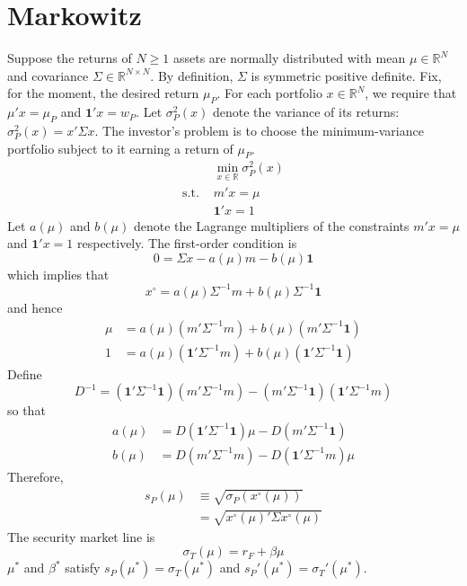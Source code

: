 \documentclass[12pt]{article}
\begin{document}
	\onehalfspacing
\section{Markowitz}
	Suppose the returns of $N\geq1$ assets are normally distributed with mean $\mu\in\mathbb{R}^{N}$ and covariance $\Sigma\in\mathbb{R}^{N\times N}$. By definition, $\Sigma$ is symmetric positive definite. Fix, for the moment, the desired return $\mu_{P}$. For each portfolio $x\in\mathbb{R}^{N}$, we require that $\mu'x=\mu_{P}$ and $\mathbf{1}'x=w_{P}$. Let $\sigma_{P}^{2}(x)$ denote the variance of its returns: $\sigma_{P}^{2}(x)=x'\Sigma x$. The investor's problem is to choose the minimum-variance portfolio subject to it earning a return of $\mu_{P}$. 
\begin{equation}
	\begin{array}{rl}
		&\min_{x\in\mathbb{R}}\sigma_{P}^{2}(x)\\
		\text{s.t. }&m'x=\mu\\
		&\mathbf{1}'x=1
	\end{array}
\end{equation}
Let $a(\mu)$ and $b(\mu)$ denote the Lagrange multipliers of the constraints $m'x=\mu$ and $\mathbf{1}'x=1$ respectively. The first-order condition is
\begin{equation}
	0=\Sigma x-a(\mu)m-b(\mu)\mathbf{1}
\end{equation}
which implies that
\begin{equation}
	x^{\circ}=a(\mu)\Sigma^{-1}m+b(\mu)\Sigma^{-1}\mathbf{1}
\end{equation}
and hence
\begin{align}
	\mu&=a(\mu)\left(m'\Sigma^{-1}m\right)+b(\mu)\left(m'\Sigma^{-1}\mathbf{1}\right)\\
	1&=a(\mu)\left(\mathbf{1}'\Sigma^{-1}m\right)+b(\mu)\left(\mathbf{1}'\Sigma^{-1}\mathbf{1}\right)
\end{align}
Define
\begin{equation}
	D^{-1}=\left(\mathbf{1}'\Sigma^{-1}\mathbf{1}\right)\left(m'\Sigma^{-1}m\right)-\left(m'\Sigma^{-1}\mathbf{1}\right)\left(\mathbf{1}'\Sigma^{-1}m\right)
\end{equation}
so that
\begin{align}
	a(\mu)&=D\left(\mathbf{1}'\Sigma^{-1}\mathbf{1}\right)\mu-D\left(m'\Sigma^{-1}\mathbf{1}\right)\\
	b(\mu)&=D\left(m'\Sigma^{-1}m\right)-D\left(\mathbf{1}'\Sigma^{-1}m\right)\mu
\end{align}
Therefore,
\begin{align}
	s_{P}(\mu)&\equiv\sqrt{\sigma_{P}(x^{\circ}(\mu))}\\
	&=\sqrt{x^{\circ}(\mu)'\Sigma x^{\circ}(\mu)}
\end{align}
The security market line is 
\begin{equation}
	\sigma_{T}(\mu)=r_F+\beta\mu
\end{equation}
$\mu^{*}$ and $\beta^{*}$ satisfy $s_{P}(\mu^{*})=\sigma_{T}(\mu^{*})$ and $s_{P}'(\mu^{*})=\sigma_{T}'(\mu^{*})$. 
\end{document}
